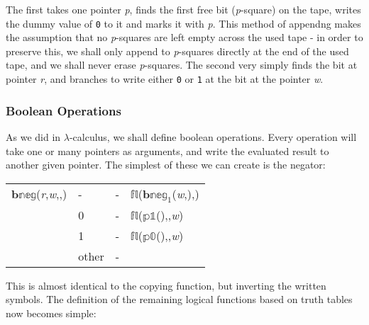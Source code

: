 \documentclass[Master.tex]{subfiles}
\begin{document}
\medskip

The first takes one pointer \textit{p}, finds the first free bit (\textit{p}-square) on the tape, writes the dummy value of \texttt{0} to it and marks it with \textit{p}. This method of appendng makes the assumption that no \textit{p}-squares are left empty across the used tape - in order to preserve this, we shall only append to \textit{p}-squares directly at the end of the used tape, and we shall never erase \textit{p}-squares. The second very simply finds the bit at pointer \textit{r}, and branches to write either \texttt{0} or \texttt{1} at the bit at the pointer \textit{w}.

\subsubsection{Boolean Operations}

As we did in $\lambda$-calculus, we shall define boolean operations. Every operation will take one or many pointers as arguments, and write the evaluated result to another given pointer. The simplest of these we can create is the negator:

\medskip\noindent\begin{tabu} to \textwidth{XXXX}
    $\mathbb{\mathbf{b}neg}$(\textit{r},\textit{w},,)   & - & - & $\mathbb{fl}$($\mathbb{\mathbf{b}neg}_1$(\textit{w},),) \\
    \hhline{----}
     & 0 & - & $\mathbb{fl}$($\mathbb{p1}$(),,\textit{w}) \\
                                                                                       & 1 & - & $\mathbb{fl}$($\mathbb{p0}$(),,\textit{w}) \\ 
                                                                                       & other & - &  \\
\end{tabu}

\medskip
This is almost identical to the copying function, but inverting the written symbols. The definition of the remaining logical functions based on truth tables now becomes simple:
\end{document}
